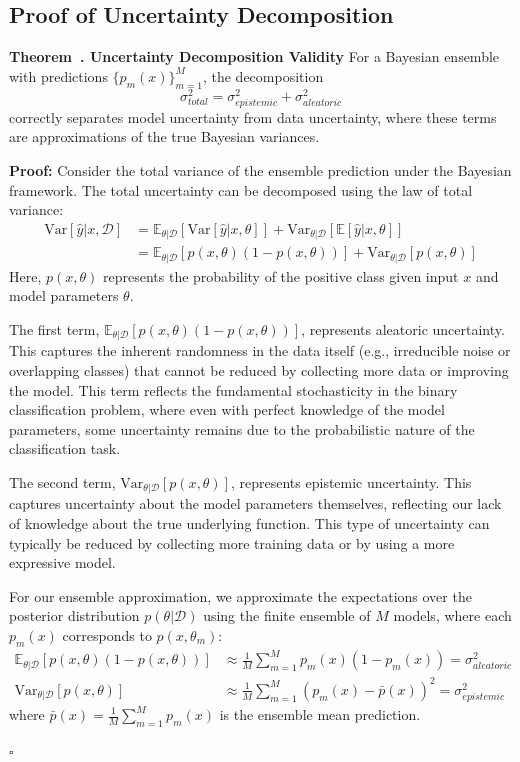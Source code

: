 \documentclass[journal]{IEEEtran}
\newcounter{theorem}
\newenvironment{theorem}[1][]{\refstepcounter{theorem}\par\medskip
   \noindent \textbf{Theorem~\thetheorem. #1} \rmfamily}{\medskip}
\newenvironment{proof}{\par\medskip\noindent \textbf{Proof:} \rmfamily}{\hfill$\square$\medskip}
\begin{document}
\subsection{Proof of Uncertainty Decomposition}

\begin{theorem}[Uncertainty Decomposition Validity]
For a Bayesian ensemble with predictions $\{p_m(x)\}_{m=1}^M$, the decomposition
\begin{equation}
\sigma_{total}^2 = \sigma_{epistemic}^2 + \sigma_{aleatoric}^2
\end{equation}
correctly separates model uncertainty from data uncertainty, where these terms are approximations of the true Bayesian variances.
\end{theorem}

\begin{proof}
Consider the total variance of the ensemble prediction under the Bayesian framework. The total uncertainty can be decomposed using the law of total variance:
\begin{align}
\text{Var}[\hat{y}|x, \mathcal{D}] &= \mathbb{E}_{\theta|\mathcal{D}}[\text{Var}[\hat{y}|x,\theta]] + \text{Var}_{\theta|\mathcal{D}}[\mathbb{E}[\hat{y}|x,\theta]] \\
&= \mathbb{E}_{\theta|\mathcal{D}}[p(x,\theta)(1-p(x,\theta))] + \text{Var}_{\theta|\mathcal{D}}[p(x,\theta)]
\end{align}
Here, $p(x,\theta)$ represents the probability of the positive class given input $x$ and model parameters $\theta$.

The first term, $\mathbb{E}_{\theta|\mathcal{D}}[p(x,\theta)(1-p(x,\theta))]$, represents aleatoric uncertainty. This captures the inherent randomness in the data itself (e.g., irreducible noise or overlapping classes) that cannot be reduced by collecting more data or improving the model. This term reflects the fundamental stochasticity in the binary classification problem, where even with perfect knowledge of the model parameters, some uncertainty remains due to the probabilistic nature of the classification task.

The second term, $\text{Var}_{\theta|\mathcal{D}}[p(x,\theta)]$, represents epistemic uncertainty. This captures uncertainty about the model parameters themselves, reflecting our lack of knowledge about the true underlying function. This type of uncertainty can typically be reduced by collecting more training data or by using a more expressive model.

For our ensemble approximation, we approximate the expectations over the posterior distribution $p(\theta|\mathcal{D})$ using the finite ensemble of $M$ models, where each $p_m(x)$ corresponds to $p(x, \theta_m)$:
\begin{align}
\mathbb{E}_{\theta|\mathcal{D}}[p(x,\theta)(1-p(x,\theta))] &\approx \frac{1}{M} \sum_{m=1}^M p_m(x)(1-p_m(x)) = \sigma_{aleatoric}^2 \\
\text{Var}_{\theta|\mathcal{D}}[p(x,\theta)] &\approx \frac{1}{M} \sum_{m=1}^M (p_m(x) - \bar{p}(x))^2 = \sigma_{epistemic}^2
\end{align}
where $\bar{p}(x) = \frac{1}{M} \sum_{m=1}^M p_m(x)$ is the ensemble mean prediction.


\end{proof}
\end{document}
